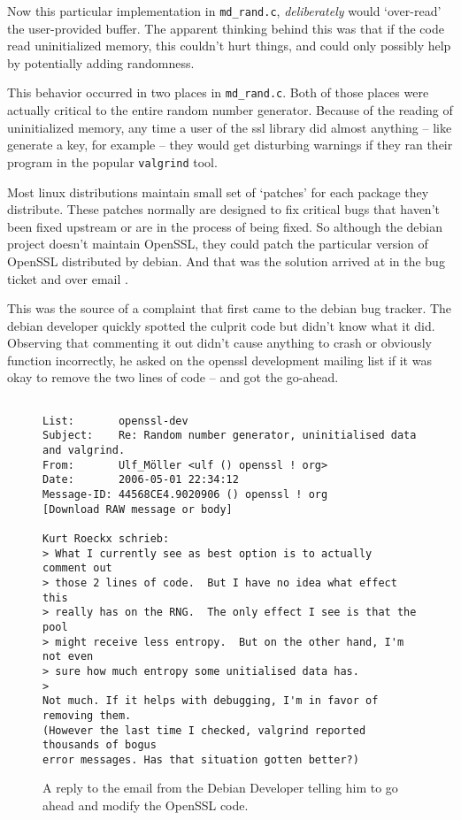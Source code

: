 \documentclass[conference]{IEEEtran}
\begin{document}
Now this particular implementation in \verb|md_rand.c|,
\emph{deliberately} would `over-read' the user-provided buffer. The
apparent thinking behind this was that if the code read uninitialized
memory, this couldn't hurt things, and could only possibly help by
potentially adding randomness.

This behavior occurred in two places in \verb|md_rand.c|. Both of
those places were actually critical to the entire random number
generator. Because of the reading of uninitialized memory, any time a
user of the ssl library did almost anything -- like generate a key,
for example -- they would get disturbing warnings if they ran their
program in the popular \verb|valgrind| tool.

Most linux distributions maintain small set of `patches' for each
package they distribute. These patches normally are designed to fix
critical bugs that haven't been fixed upstream or are in the process
of being fixed. So although the debian project doesn't maintain
OpenSSL, they could patch the particular version of OpenSSL
distributed by debian. And that was the solution arrived at in the bug
ticket and over email \cite{2}\cite{4}.

This was the source of a complaint that first came to the debian bug
tracker\cite{2}. The debian developer quickly spotted the culprit code
but didn't know what it did. Observing that commenting it out didn't
cause anything to crash or obviously function incorrectly, he asked on
the openssl development mailing list if it was okay to remove the two
lines of code -- and got the go-ahead.

\begin{figure*}[!t]
\centering
\begin{displayquote}
\begin{verbatim}

List:       openssl-dev
Subject:    Re: Random number generator, uninitialised data and valgrind.
From:       Ulf_Möller <ulf () openssl ! org>
Date:       2006-05-01 22:34:12
Message-ID: 44568CE4.9020906 () openssl ! org
[Download RAW message or body]

Kurt Roeckx schrieb:
> What I currently see as best option is to actually comment out
> those 2 lines of code.  But I have no idea what effect this
> really has on the RNG.  The only effect I see is that the pool
> might receive less entropy.  But on the other hand, I'm not even
> sure how much entropy some unitialised data has.
>   
Not much. If it helps with debugging, I'm in favor of removing them. 
(However the last time I checked, valgrind reported thousands of bogus 
error messages. Has that situation gotten better?)
\end{verbatim}
\end{displayquote}
\caption{A reply to the email from the Debian Developer telling him to go ahead and modify the OpenSSL code.\cite{4}}
\end{figure*}
\end{document}
